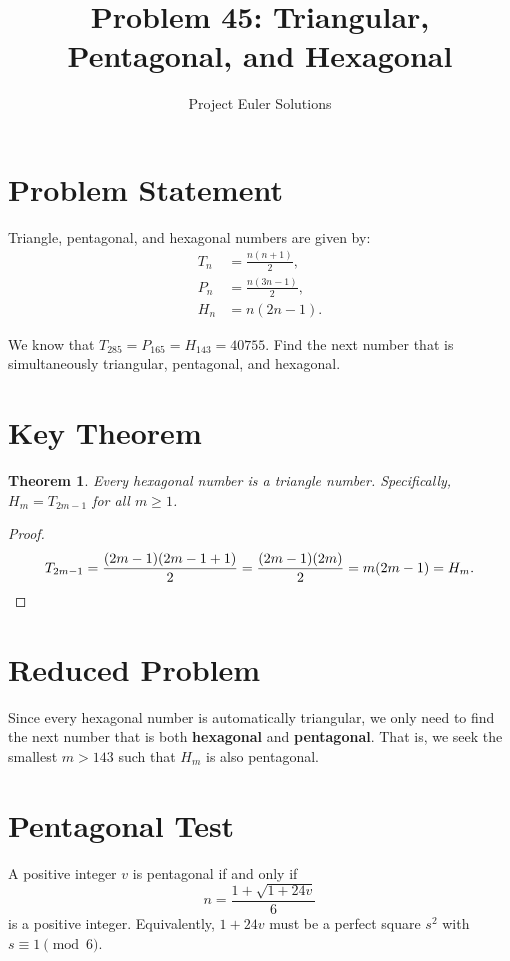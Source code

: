\documentclass[12pt]{article}
\title{Problem 45: Triangular, Pentagonal, and Hexagonal}
\author{Project Euler Solutions}
\date{}
\newtheorem{theorem}{Theorem}
\begin{document}
\maketitle

\section{Problem Statement}

Triangle, pentagonal, and hexagonal numbers are given by:
\begin{align*}
T_n &= \frac{n(n+1)}{2}, \\
P_n &= \frac{n(3n-1)}{2}, \\
H_n &= n(2n-1).
\end{align*}

We know that $T_{285} = P_{165} = H_{143} = 40755$. Find the next number that is simultaneously triangular, pentagonal, and hexagonal.

\section{Key Theorem}

\begin{theorem}
Every hexagonal number is a triangle number. Specifically, $H_m = T_{2m-1}$ for all $m \geq 1$.
\end{theorem}

\begin{proof}
\[
T_{2m-1} = \frac{(2m-1)(2m-1+1)}{2} = \frac{(2m-1)(2m)}{2} = m(2m-1) = H_m. \qedhere
\]
\end{proof}

\section{Reduced Problem}

Since every hexagonal number is automatically triangular, we only need to find the next number that is both \textbf{hexagonal} and \textbf{pentagonal}. That is, we seek the smallest $m > 143$ such that $H_m$ is also pentagonal.

\section{Pentagonal Test}

A positive integer $v$ is pentagonal if and only if
\[
n = \frac{1 + \sqrt{1 + 24v}}{6}
\]
is a positive integer. Equivalently, $1 + 24v$ must be a perfect square $s^2$ with $s \equiv 1 \pmod{6}$.
\end{document}
